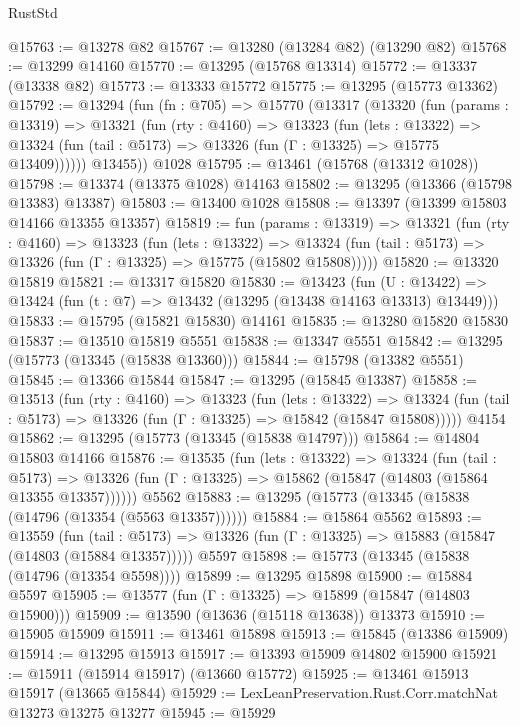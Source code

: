 \begin{lexlean}{RustStd}
\begin{coremodule}
@15763 := @13278 @82
@15767 := @13280 (@13284 @82) (@13290 @82)
@15768 := @13299 @14160
@15770 := @13295 (@15768 @13314)
@15772 := @13337 (@13338 @82)
@15773 := @13333 @15772
@15775 := @13295 (@15773 @13362)
@15792 := @13294
    (fun (fn : @705) =>
    @15770
      (@13317
        (@13320
          (fun (params : @13319) =>
          @13321
            (fun (rty : @4160) =>
            @13323
              (fun (lets : @13322) =>
              @13324 (fun (tail : @5173) => @13326 (fun (Γ : @13325) => @15775 @13409))))))
        @13455))
    @1028
@15795 := @13461 (@15768 (@13312 @1028))
@15798 := @13374 (@13375 @1028) @14163
@15802 := @13295 (@13366 (@15798 @13383) @13387)
@15803 := @13400 @1028
@15808 := @13397 (@13399 @15803 @14166 @13355 @13357)
@15819 := fun (params : @13319) =>
  @13321
    (fun (rty : @4160) =>
    @13323
      (fun (lets : @13322) =>
      @13324 (fun (tail : @5173) => @13326 (fun (Γ : @13325) => @15775 (@15802 @15808)))))
@15820 := @13320 @15819
@15821 := @13317 @15820
@15830 := @13423
    (fun (U : @13422) => @13424 (fun (t : @7) => @13432 (@13295 (@13438 @14163 @13313) @13449)))
@15833 := @15795 (@15821 @15830) @14161
@15835 := @13280 @15820 @15830
@15837 := @13510 @15819 @5551
@15838 := @13347 @5551
@15842 := @13295 (@15773 (@13345 (@15838 @13360)))
@15844 := @15798 (@13382 @5551)
@15845 := @13366 @15844
@15847 := @13295 (@15845 @13387)
@15858 := @13513
    (fun (rty : @4160) =>
    @13323
      (fun (lets : @13322) =>
      @13324 (fun (tail : @5173) => @13326 (fun (Γ : @13325) => @15842 (@15847 @15808)))))
    @4154
@15862 := @13295 (@15773 (@13345 (@15838 @14797)))
@15864 := @14804 @15803 @14166
@15876 := @13535
    (fun (lets : @13322) =>
    @13324
      (fun (tail : @5173) =>
      @13326 (fun (Γ : @13325) => @15862 (@15847 (@14803 (@15864 @13355 @13357))))))
    @5562
@15883 := @13295 (@15773 (@13345 (@15838 (@14796 (@13354 (@5563 @13357))))))
@15884 := @15864 @5562
@15893 := @13559
    (fun (tail : @5173) => @13326 (fun (Γ : @13325) => @15883 (@15847 (@14803 (@15884 @13357)))))
    @5597
@15898 := @15773 (@13345 (@15838 (@14796 (@13354 @5598))))
@15899 := @13295 @15898
@15900 := @15884 @5597
@15905 := @13577 (fun (Γ : @13325) => @15899 (@15847 (@14803 @15900)))
@15909 := @13590 (@13636 (@15118 @13638)) @13373
@15910 := @15905 @15909
@15911 := @13461 @15898
@15913 := @15845 (@13386 @15909)
@15914 := @13295 @15913
@15917 := @13393 @15909 @14802 @15900
@15921 := @15911 (@15914 @15917) (@13660 @15772)
@15925 := @13461 @15913 @15917 (@13665 @15844)
@15929 := LexLeanPreservation.Rust.Corr.matchNat @13273 @13275 @13277
@15945 := @15929

\end{coremodule}
\end{lexlean}
